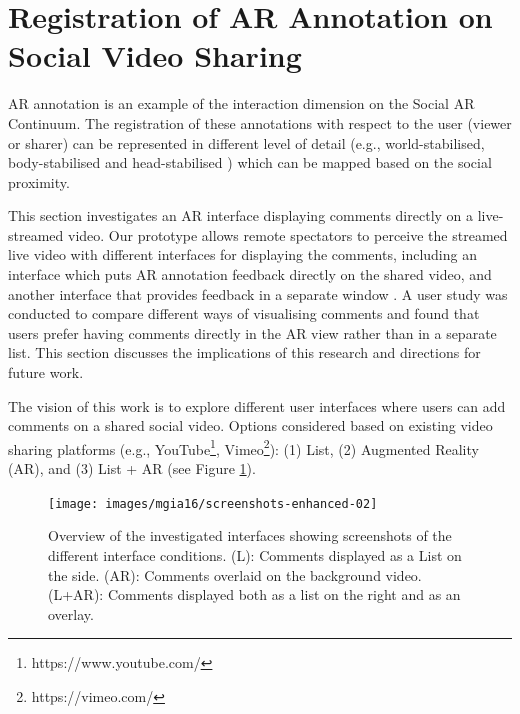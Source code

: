 \section{Registration of AR Annotation on Social Video Sharing}
\label{sec:video}

AR annotation is an example of the interaction dimension on the Social AR Continuum. The registration of these annotations with respect to the user (viewer or sharer) can be represented in different level of detail (e.g., world-stabilised, body-stabilised and head-stabilised \cite{Billinghurst1998}) which can be mapped based on the social proximity. 

This section investigates an AR interface displaying comments directly on a live-streamed video. Our prototype allows remote spectators to perceive the streamed live video with different interfaces for displaying the comments, including an interface which puts AR annotation feedback directly on the shared video, and another interface that provides feedback in a separate window \cite{Nassani2016}. A user study was conducted to compare different ways of visualising comments and found that users prefer having comments directly in the AR view rather than in a separate list. This section discusses the implications of this research and directions for future work.



The vision of this work is to explore different user interfaces where users can add comments on a shared social video. Options considered based on existing video sharing platforms (e.g., YouTube\footnote{https://www.youtube.com/}, Vimeo\footnote{https://vimeo.com/}): (1) List, (2) Augmented Reality (AR), and (3) List + AR (see Figure \ref{fig:mgia16:conditions}).

\begin{figure}
  \texttt{[image: images/mgia16/screenshots-enhanced-02]}
  \caption{Overview of the investigated interfaces showing screenshots of the different interface conditions. (L): Comments displayed as a List on the side. (AR): Comments overlaid on the background video. (L+AR): Comments displayed both as a list on the right and as an overlay. }
  \label{fig:mgia16:conditions}
\end{figure}


